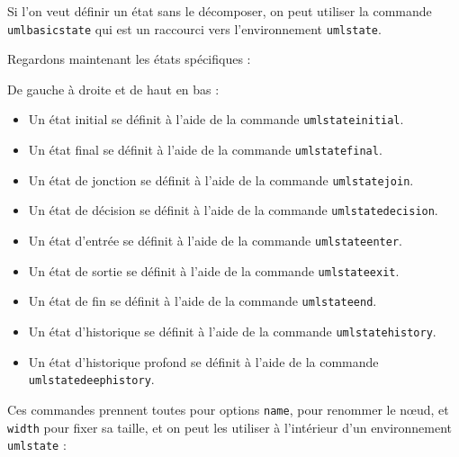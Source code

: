 \documentclass[a4paper,11pt]{report}
\newcommand{\inputTikZ}[1]{%
  }%
\newcommand{\inputTikZ}[1]{%
    \texttt{[image: fig/\#1.pdf]}%
  }%
\begin{document}
\medskip

Si l'on veut définir un état sans le décomposer, on peut utiliser la commande {\tt umlbasicstate} qui est un raccourci vers l'environnement {\tt umlstate}.

\medskip

Regardons maintenant les états spécifiques :

\medskip

\begin{minipage}{0.51\textwidth}

\end{minipage}
\begin{minipage}{0.49\textwidth}
\begin{center}
\inputTikZ{statespecial}
\end{center}
\end{minipage}

\medskip

De gauche à droite et de haut en bas :

\medskip

\begin{itemize}
\item Un état initial se définit à l'aide de la commande {\tt umlstateinitial}.
\item Un état final se définit à l'aide de la commande {\tt umlstatefinal}.
\item Un état de jonction se définit à l'aide de la commande {\tt umlstatejoin}.
\item Un état de décision se définit à l'aide de la commande {\tt umlstatedecision}.
\item Un état d'entrée se définit à l'aide de la commande {\tt umlstateenter}.
\item Un état de sortie se définit à l'aide de la commande {\tt umlstateexit}.
\item Un état de fin se définit à l'aide de la commande {\tt umlstateend}.
\item Un état d'historique se définit à l'aide de la commande {\tt umlstatehistory}.
\item Un état d'historique profond se définit à l'aide de la commande {\tt umlstatedeephistory}.
\end{itemize}

\medskip

Ces commandes prennent toutes pour options {\tt name}, pour renommer le n\oe{}ud, et {\tt width} pour fixer sa taille, et on peut les utiliser à l'intérieur d'un environnement {\tt umlstate} :
\end{document}
